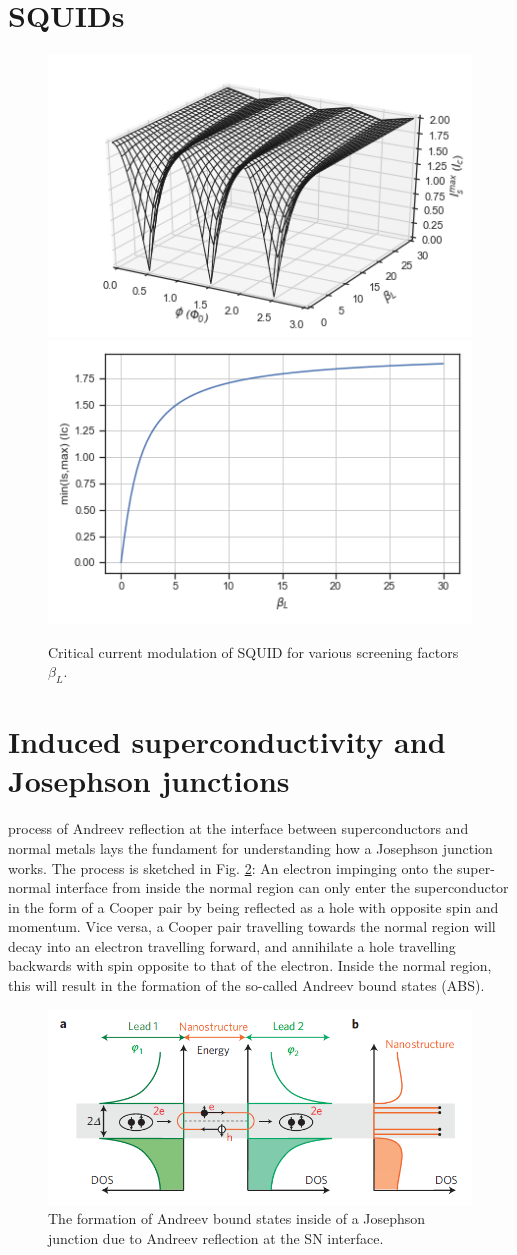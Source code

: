 \section{SQUIDs}

\begin{figure}
	\centering
	\includegraphics[width=0.5\linewidth]{./chapter-theory/figs-JJ/SQUID_betaL}
	\includegraphics[width=0.4\linewidth]{./chapter-theory/figs-JJ/SQUID_betaL_I}
	\caption{Critical current modulation of SQUID for various screening factors $\beta_L$.}
	\label{fig:betaL}
\end{figure}

\section{Induced superconductivity and Josephson junctions}

 process of Andreev reflection at the interface between superconductors and normal metals lays the fundament for understanding how a Josephson junction works.
The process is sketched in Fig. \ref{fig:kdtmk}:
An electron impinging onto the super-normal interface from inside the normal region can only enter the superconductor in the form of a Cooper pair by being reflected as a hole with opposite spin and momentum.
Vice versa, a Cooper pair travelling towards the normal region will decay into an electron travelling forward, and annihilate a hole travelling backwards with spin opposite to that of the electron.
Inside the normal region, this will result in the formation of the so-called Andreev bound states (ABS).

\begin{figure}
	\centering
	\includegraphics[width=0.7\linewidth]{./chapter-theory/figs-JJ/KDTMK}
	\caption{The formation of Andreev bound states inside of a Josephson junction due to Andreev reflection at the SN interface.}
	\label{fig:kdtmk}
\end{figure}

